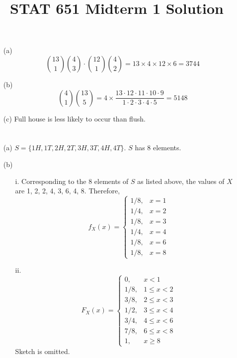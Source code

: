 \documentclass[12pt]{article}
\begin{document}
\title{STAT 651 Midterm 1 Solution}
\maketitle

\section{}

\begin{enumerate}
\item[(a)]
\[
{13\choose 1}{4\choose 3}\cdot {12\choose 1}{4\choose 2}
= 13 \times 4 \times 12 \times 6
= 3744
\]

\item[(b)]
\[
{4\choose 1}{13\choose 5}
= 4\times \frac{13\cdot 12 \cdot 11 \cdot 10\cdot 9}
    {1\cdot 2 \cdot 3\cdot 4\cdot 5}
= 5148
\]

\item[(c)] Full house is less likely to occur than flush.
\end{enumerate}

\section{}

\begin{enumerate}
\item[(a)]
$S = \{1H, 1T, 2H, 2T, 3H, 3T, 4H, 4T\}$.
$S$ has 8 elements.

\item[(b)]
\begin{enumerate}
\item[i.]
Corresponding to the 8 elements of $S$ as listed above,
the values of $X$ are 1, 2, 2, 4, 3, 6, 4, 8.
Therefore,
\[
f_X(x) = \begin{cases}
    1/8, & x = 1\\
    1/4, & x = 2\\
    1/8, & x = 3\\
    1/4, & x = 4\\
    1/8, & x = 6\\
    1/8, & x = 8
\end{cases}
\]

\item[ii.]
\[
F_X(x) = \begin{cases}
    0,   & x < 1\\
    1/8, & 1 \le x < 2\\
    3/8, & 2 \le x < 3\\
    1/2, & 3 \le x < 4\\
    3/4, & 4 \le x < 6\\
    7/8, & 6 \le x < 8\\
    1,   & x \ge 8
\end{cases}
\]
Sketch is omitted.
\end{enumerate}
\end{enumerate}
\end{document}
